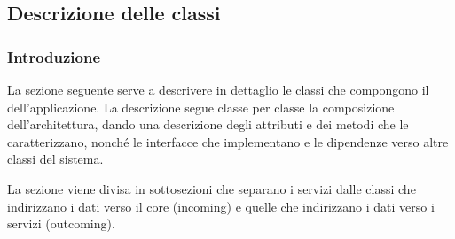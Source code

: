 \subsection{Descrizione delle classi}

\subsubsection{Introduzione}
\par La sezione seguente serve a descrivere in dettaglio le classi che compongono il  dell'applicazione. La descrizione segue classe per classe la composizione dell'architettura, dando una descrizione degli attributi e dei metodi che le caratterizzano, nonché le interfacce che implementano e le dipendenze verso altre classi del sistema.
\par La sezione viene divisa in sottosezioni che separano i servizi dalle classi che indirizzano i dati verso il core (incoming) e quelle che indirizzano i dati verso i servizi (outcoming).


